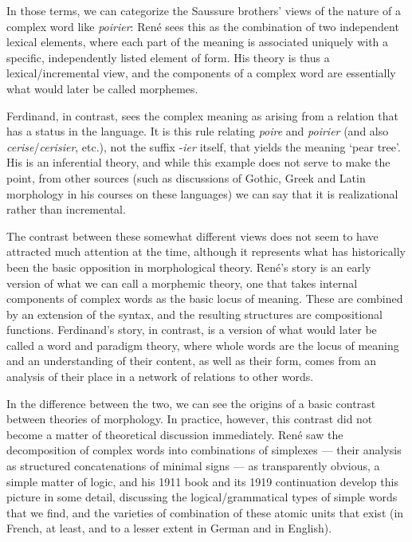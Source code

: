 \documentclass[output=paper]{langsci/langscibook}
\begin{document}
In those terms, we can categorize the Saussure brothers’ views of the
nature of a complex word like \emph{poirier}: René sees this as the
combination of two independent lexical elements, where each part of
the meaning is associated uniquely with a specific, independently
listed element of form. His theory is thus a lexical/incremental view,
and the components of a complex word are essentially what would later
be called morphemes.  

Ferdinand, in contrast, sees the complex meaning as arising from a
relation that has a status in the language.  It is this rule relating
\emph{poire} and \emph{poirier} (and also
\emph{cerise}/\emph{cerisier}, etc.), not the suffix -\emph{ier}
itself, that yields the meaning ‘pear tree’. His is an inferential
theory, and while this example does not serve to make the point, from
other sources (such as discussions of Gothic, Greek and Latin
morphology in his courses on these languages) we can say that it is
realizational rather than incremental.

The contrast between these somewhat different views does not seem to
have attracted much attention at the time, although it represents what
has historically been the basic opposition in morphological theory.
René’s story is an early version of what we can call a morphemic
theory, one that takes internal components of complex words as the
basic locus of meaning. These are combined by an extension of the
syntax, and the resulting structures are compositional functions.
Ferdinand’s story, in contrast, is a version of what would later be
called a word and paradigm theory, where whole words are the locus of
meaning and an understanding of their content, as well as their form,
comes from an analysis of their place in a network of relations to
other words.

In the difference between the two, we can see the origins of a basic
contrast between theories of morphology.  In practice, however, this
contrast did not become a matter of theoretical discussion
immediately.  René saw the decomposition of complex words into
combinations of simplexes --- their analysis as structured
concatenations of minimal signs --- as transparently obvious, a simple
matter of logic, and his 1911 book and its 1919 continuation develop
this picture in some detail, discussing the logical/grammatical types
of simple words that we find, and the varieties of combination of
these atomic units that exist (in French, at least, and to a lesser
extent in German and in English).
\end{document}
